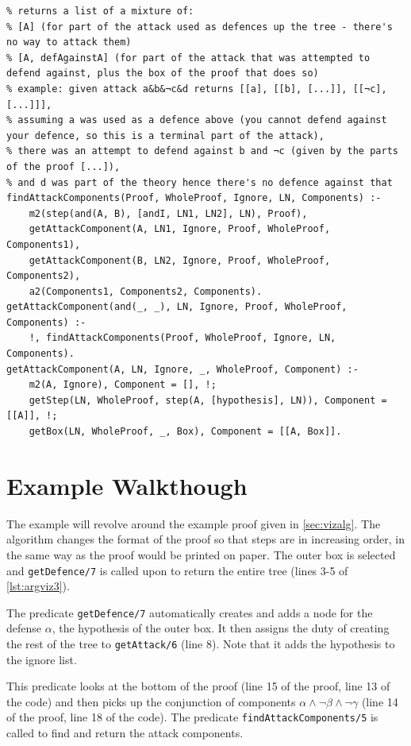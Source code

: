 \documentclass[11pt,twoside,a4paper]{report}
\begin{document}
\begin{lstlisting}[caption={Third part of the proof visualization algorithm},label=lst:argviz3]
% Breaks down an attack into individual components and the defence attempts against them
% returns a list of a mixture of:
% [A] (for part of the attack used as defences up the tree - there's no way to attack them)
% [A, defAgainstA] (for part of the attack that was attempted to defend against, plus the box of the proof that does so)
% example: given attack a&b&¬c&d returns [[a], [[b], [...]], [[¬c], [...]]],
% assuming a was used as a defence above (you cannot defend against your defence, so this is a terminal part of the attack),
% there was an attempt to defend against b and ¬c (given by the parts of the proof [...]),
% and d was part of the theory hence there's no defence against that
findAttackComponents(Proof, WholeProof, Ignore, LN, Components) :-
	m2(step(and(A, B), [andI, LN1, LN2], LN), Proof),
	getAttackComponent(A, LN1, Ignore, Proof, WholeProof, Components1),
	getAttackComponent(B, LN2, Ignore, Proof, WholeProof, Components2),
	a2(Components1, Components2, Components).
getAttackComponent(and(_, _), LN, Ignore, Proof, WholeProof, Components) :-
	!, findAttackComponents(Proof, WholeProof, Ignore, LN, Components).
getAttackComponent(A, LN, Ignore, _, WholeProof, Component) :-
	m2(A, Ignore), Component = [], !;
	getStep(LN, WholeProof, step(A, [hypothesis], LN)), Component = [[A]], !;
	getBox(LN, WholeProof, _, Box), Component = [[A, Box]].
\end{lstlisting}

\section{Example Walkthough}
The example will revolve around the example proof given in \autoref{sec:vizalg}. The algorithm changes the format of the proof so that steps are in increasing order, in the same way as the proof would be printed on paper. The outer box is selected and \lstinline$getDefence/7$ is called upon to return the entire tree (lines 3-5 of \autoref{lst:argviz3}).

The predicate \lstinline$getDefence/7$ automatically creates and adds a node for the defense $\alpha$, the hypothesis of the outer box. It then assigns the duty of creating the rest of the tree to \lstinline$getAttack/6$ (line 8). Note that it adds the hypothesis to the ignore list.

This predicate looks at the bottom of the proof (line 15 of the proof, line 13 of the code) and then picks up the conjunction of components $\alpha\wedge\neg\beta\wedge\neg\gamma$ (line 14 of the proof, line 18 of the code). The predicate \lstinline$findAttackComponents/5$ is called to find and return the attack components.
\end{document}
